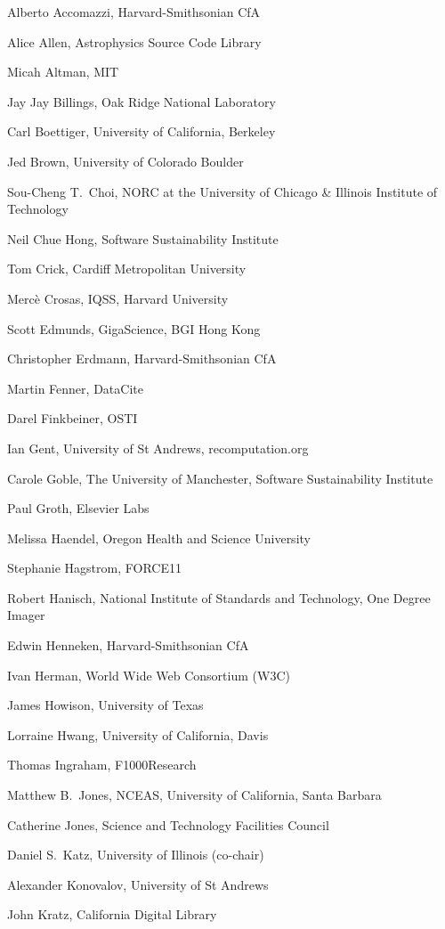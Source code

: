 \documentclass[11pt, oneside]{amsart}
\begin{document}
Alberto Accomazzi, Harvard-Smithsonian CfA

Alice Allen, Astrophysics Source Code Library

Micah Altman, MIT

Jay Jay Billings, Oak Ridge National Laboratory

Carl Boettiger, University of California,  Berkeley

Jed Brown, University of Colorado Boulder

Sou-Cheng T.~Choi, NORC at the University of Chicago \& Illinois Institute of Technology

Neil Chue Hong, Software Sustainability Institute

Tom Crick, Cardiff Metropolitan University

Merc\`e Crosas, IQSS, Harvard University

Scott Edmunds, GigaScience, BGI Hong Kong

Christopher Erdmann, Harvard-Smithsonian CfA

Martin Fenner, DataCite

Darel Finkbeiner, OSTI

Ian Gent, University of St Andrews, recomputation.org

Carole Goble, The University of Manchester, Software Sustainability Institute

Paul Groth, Elsevier Labs

Melissa Haendel, Oregon Health and Science University

Stephanie Hagstrom, FORCE11

Robert Hanisch, National Institute of Standards and Technology, One Degree Imager

Edwin Henneken, Harvard-Smithsonian CfA

Ivan Herman, World Wide Web Consortium (W3C)

James Howison, University of Texas

Lorraine Hwang, University of California,  Davis

Thomas Ingraham, F1000Research

Matthew B.~Jones, NCEAS, University of California,  Santa Barbara

Catherine Jones, Science and Technology Facilities Council

Daniel S.~Katz, University of Illinois (co-chair)

Alexander Konovalov, University of St Andrews

John Kratz, California Digital Library
\end{document}
